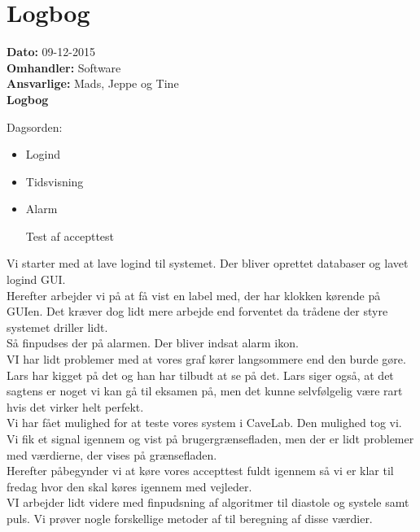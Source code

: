 \section{Logbog}

\textbf{Dato:} 09-12-2015 \\
\textbf{Omhandler:} Software \\
\textbf{Ansvarlige:} Mads, Jeppe og Tine \\
\textbf{Logbog}

Dagsorden:
\begin{itemize}
	\item Logind
	\item Tidsvisning
	\item Alarm
	\item[Test af accepttest]
\end{itemize}

Vi starter med at lave logind til systemet. Der bliver oprettet databaser og lavet logind GUI.\\
Herefter arbejder vi på at få vist en label med, der har klokken kørende på GUIen. Det kræver dog lidt mere arbejde end forventet da trådene der styre systemet driller lidt.\\
Så finpudses der på alarmen. Der bliver indsat alarm ikon.\\
VI har lidt problemer med at vores graf kører langsommere end den burde gøre. Lars har kigget på det og han har tilbudt at se på det. Lars siger også, at det sagtens er noget vi kan gå til eksamen på, men det kunne selvfølgelig være rart hvis det virker helt perfekt. \\
Vi har fået mulighed for at teste vores system i CaveLab. Den mulighed tog vi. Vi fik et signal igennem og vist på brugergrænsefladen, men der er lidt problemer med værdierne, der vises på grænsefladen.\\
Herefter påbegynder vi at køre vores accepttest fuldt igennem så vi er klar til fredag hvor den skal køres igennem med vejleder.\\
VI arbejder lidt videre med finpudsning af algoritmer til diastole og systele samt puls. Vi prøver nogle forskellige metoder af til beregning af disse værdier.
